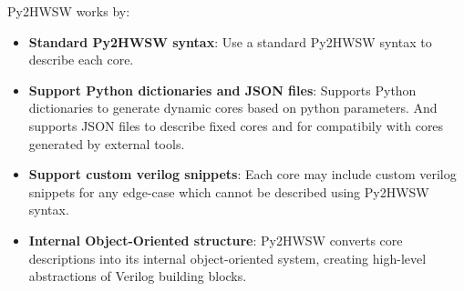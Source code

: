%

Py2HWSW works by:
\begin{itemize}
    \item \textbf{Standard Py2HWSW syntax}: Use a standard Py2HWSW
      syntax to describe each core.
    \item \textbf{Support Python dictionaries and JSON files}: Supports Python
      dictionaries to generate dynamic cores based on python parameters. And
      supports JSON files to describe fixed cores and for compatibily with cores
      generated by external tools.
    \item \textbf{Support custom verilog snippets}: Each core may include custom
      verilog snippets for any edge-case which cannot be described using Py2HWSW
      syntax.
    \item \textbf{Internal Object-Oriented structure}: Py2HWSW converts core
      descriptions into its internal object-oriented system, creating high-level
      abstractions of Verilog building blocks.
\end{itemize}
